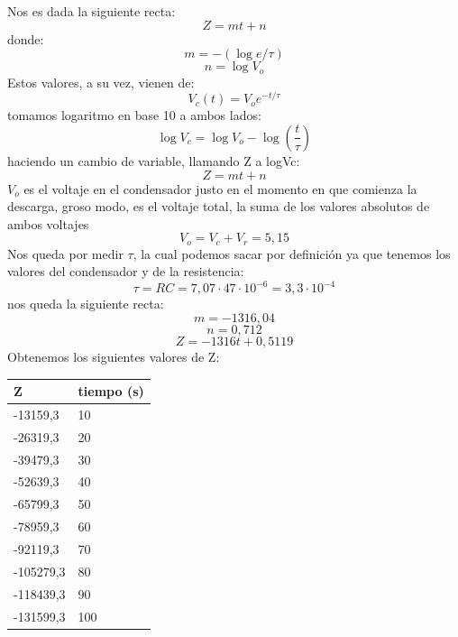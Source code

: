 \documentclass{article}
\begin{document}
Nos es dada la siguiente recta:
\begin{equation}
    Z=mt+n
\end{equation}
donde:
\begin{equation}
    m=-(\log e/\tau)
\end{equation}
\begin{equation}
    n=\log V_o    
\end{equation}
Estos valores, a su vez, vienen de:
\begin{equation}
V_c(t) = V_o e^{-t/\tau}
\end{equation}
tomamos logaritmo en base 10 a ambos lados:
\begin{equation}
     \log V_c = \log V_o - \log\left( \frac{t}{\tau} \right) 
\end{equation}
haciendo un cambio de variable, llamando Z a logVc:
\begin{equation}
    Z=mt+n
\end{equation}
$V_o$ es el voltaje en el condensador justo en el momento en que comienza la descarga, groso modo, es el voltaje total, la suma de los valores absolutos de ambos voltajes
\begin{equation}
    V_o=V_c+V_r=5,15
\end{equation}
Nos queda por medir $\tau$, la cual podemos sacar por definición ya que tenemos los valores del condensador y de la resistencia:
\begin{equation}
    \tau=RC=7,07·47\cdot10^{-6}=3,3\cdot10^{-4}
\end{equation}
nos queda la siguiente recta:
\begin{equation}
    m=-1316,04
\end{equation}
\begin{equation}
    n=0,712
\end{equation}
\begin{equation}
    Z=-1316t+0,5119
\end{equation}
Obtenemos los siguientes valores de Z:
\begin{table}[H]
    \centering
    \begin{tabular}{|l|l|}
    \hline
        Z & tiempo (s) \\ \hline
        -13159,3 & 10 \\ \hline
        -26319,3 & 20 \\ \hline
        -39479,3 & 30 \\ \hline
        -52639,3 & 40 \\ \hline
        -65799,3 & 50 \\ \hline
        -78959,3 & 60 \\ \hline
        -92119,3 & 70 \\ \hline
        -105279,3 & 80 \\ \hline
        -118439,3 & 90 \\ \hline
        -131599,3 & 100 \\ \hline
    \end{tabular}
\end{table}
\end{document}
